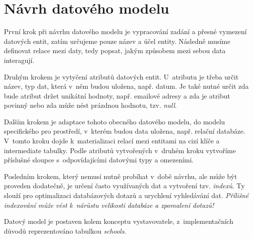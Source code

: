 \section{Návrh datového modelu}
\label{sub:data-model}

První krok\cite{data-model} při návrhu datového modelu je vypracování zadání a přesné vymezení datových entit, zatím určujeme pouze název a účel entity.
Následně musíme definovat relace mezi daty, tedy popsat, jakým způsobem mezi sebou data interagují.

Druhým krokem je vytyčení atributů datových entit.
U~atributu je třeba určit název, typ dat, která v~něm budou uložena, např. datum.
Je také nutné určit zda bude atribut držet unikátní hodnoty, např. emailové adresy a zda je atribut povinný nebo zda může nést prázdnou hodnotu, tzv. \emph{null}\cite{null}.

Dalším krokem je adaptace tohoto obecného datového modelu, do modelu specifického pro prostředí, v~kterém budou data uložena, např. relační databáze.
V~tomto kroku dojde k~materializaci relací mezi entitami na cizí klíče a intermediate tabulky\cite{intermediate-table}.
Podle atributů vytvořených v~druhém kroku vytvoříme příslušné sloupce s~odpovídajícími datovými typy a omezeními. 

Posledním krokem, který nemusí nutně probíhat v~době návrhu, ale může být proveden dodatečně, je určení často využívaných dat a vytvoření tzv. \emph{indexů}\cite{index}.
Ty slouží pro optimalizaci databázových dotazů a urychlení vyhledávání dat.
\emph{Přílišné indexování může vést k~nárůstu velikosti databáze a zpomalení dotazů!}\cite{bad-indexing}

Datový model \bso{} je postaven kolem konceptu vystavovatele, z~implementačních důvodů reprezentováno tabulkou \emph{schools}.

